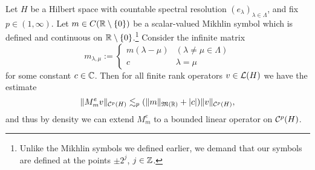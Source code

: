 \begin{thm}\label{thm:Schur-multipliers}
  Let $H$ be a Hilbert space with countable spectral resolution $(e_{\lambda})_{\lambda \in \Lambda}$, and fix $p \in (1,\infty)$.
  Let $m \in C(\mathbb{R} \setminus \{0\})$ be a scalar-valued Mikhlin symbol which is defined and continuous on $\mathbb{R} \setminus \{0\}$.\footnote{Unlike the Mikhlin symbols we defined earlier, we demand that our symbols are defined at the points $\pm 2^{j}$, $j \in \mathbb{Z}$.}
  Consider the infinite matrix
  \begin{equation*}
    m_{\lambda,\mu} :=
    \begin{cases}
      m(\lambda - \mu) & (\lambda \neq \mu \in \Lambda) \\ c & \lambda = \mu
    \end{cases}
  \end{equation*}
  for some constant $c \in \mathbb{C}$.
  Then for all finite rank operators $v \in \mathcal{L}(H)$ we have the estimate
  \begin{equation*}
    \|M_{m}^{e} v\|_{\mathcal{C}^{p}(H)} \lesssim_{p} (\|m\|_{\mathfrak{M}(\mathbb{R})} + |c|) \|v\|_{\mathcal{C}^{p}(H)},
  \end{equation*}
  and thus by density we can extend $M_{m}^{e}$ to a bounded linear operator on $\mathcal{C}^{p}(H)$.
\end{thm}

